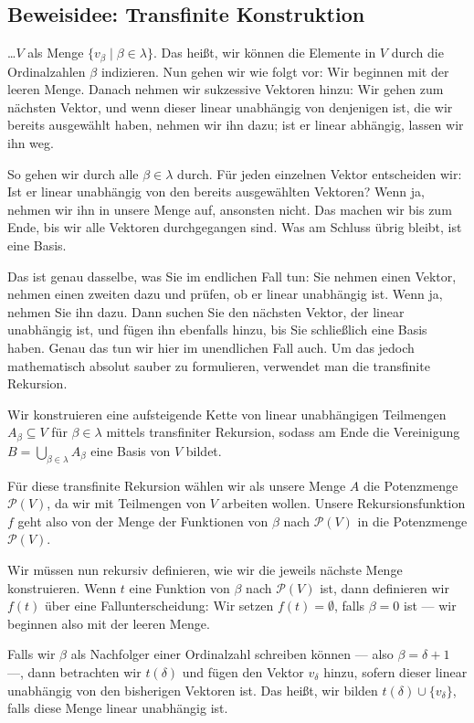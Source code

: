 \subsection{Beweisidee: Transfinite Konstruktion}
\begin{spoken-clean}[00:39:55 - 00:42:10]
\dots $V$ als Menge $\{v_\beta \mid \beta \in \lambda\}$. Das heißt, wir können die Elemente in $V$ durch die Ordinalzahlen $\beta$ indizieren. Nun gehen wir wie folgt vor: Wir beginnen mit der leeren Menge. Danach nehmen wir sukzessive Vektoren hinzu: Wir gehen zum nächsten Vektor, und wenn dieser linear unabhängig von denjenigen ist, die wir bereits ausgewählt haben, nehmen wir ihn dazu; ist er linear abhängig, lassen wir ihn weg.

So gehen wir durch alle $\beta \in \lambda$ durch. Für jeden einzelnen Vektor entscheiden wir: Ist er linear unabhängig von den bereits ausgewählten Vektoren? Wenn ja, nehmen wir ihn in unsere Menge auf, ansonsten nicht. Das machen wir bis zum Ende, bis wir alle Vektoren durchgegangen sind. Was am Schluss übrig bleibt, ist eine Basis.

Das ist genau dasselbe, was Sie im endlichen Fall tun: Sie nehmen einen Vektor, nehmen einen zweiten dazu und prüfen, ob er linear unabhängig ist. Wenn ja, nehmen Sie ihn dazu. Dann suchen Sie den nächsten Vektor, der linear unabhängig ist, und fügen ihn ebenfalls hinzu, bis Sie schließlich eine Basis haben. Genau das tun wir hier im unendlichen Fall auch. Um das jedoch mathematisch absolut sauber zu formulieren, verwendet man die transfinite Rekursion.
\end{spoken-clean}

\begin{math-stroke}
Wir konstruieren eine aufsteigende Kette von linear unabhängigen Teilmengen $A_\beta \subseteq V$ für $\beta \in \lambda$ mittels transfiniter Rekursion, sodass am Ende die Vereinigung $B = \bigcup_{\beta \in \lambda} A_\beta$ eine Basis von $V$ bildet.
\end{math-stroke}

\begin{spoken-clean}[00:42:10 - 00:43:40]
Für diese transfinite Rekursion wählen wir als unsere Menge $A$ die Potenzmenge $\mathcal{P}(V)$, da wir mit Teilmengen von $V$ arbeiten wollen. Unsere Rekursionsfunktion $f$ geht also von der Menge der Funktionen von $\beta$ nach $\mathcal{P}(V)$ in die Potenzmenge $\mathcal{P}(V)$.

Wir müssen nun rekursiv definieren, wie wir die jeweils nächste Menge konstruieren. Wenn $t$ eine Funktion von $\beta$ nach $\mathcal{P}(V)$ ist, dann definieren wir $f(t)$ über eine Fallunterscheidung: Wir setzen $f(t) = \emptyset$, falls $\beta = 0$ ist --- wir beginnen also mit der leeren Menge.

Falls wir $\beta$ als Nachfolger einer Ordinalzahl schreiben können --- also $\beta = \delta + 1$ ---, dann betrachten wir $t(\delta)$ und fügen den Vektor $v_\delta$ hinzu, sofern dieser linear unabhängig von den bisherigen Vektoren ist. Das heißt, wir bilden $t(\delta) \cup \{v_\delta\}$, falls diese Menge linear unabhängig ist.
\end{spoken-clean}

